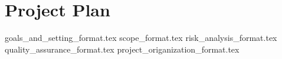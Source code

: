 \documentclass{article}
\begin{document}

\section*{Project Plan}
{goals_and_setting_format.tex}
{scope_format.tex}
{risk_analysis_format.tex}
{quality_assurance_format.tex}
{project_origanization_format.tex}



\end{document}
